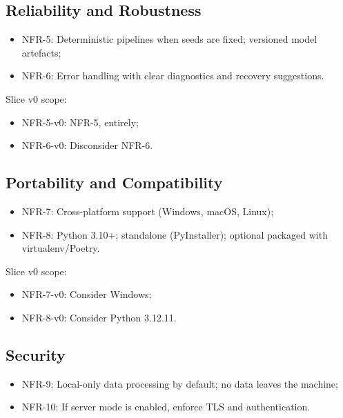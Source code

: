 \subsection{Reliability and Robustness}

\begin{itemize}
    \item NFR-5: Deterministic pipelines when seeds are fixed; versioned model artefacts;
    \item NFR-6: Error handling with clear diagnostics and recovery suggestions.
\end{itemize}

Slice v0 scope:

\begin{itemize}
    \item NFR-5-v0: NFR-5, entirely;
    \item NFR-6-v0: Disconsider NFR-6.
\end{itemize}

\subsection{Portability and Compatibility}

\begin{itemize}
    \item NFR-7: Cross-platform support (Windows, macOS, Linux);
    \item NFR-8: Python 3.10+; standalone (PyInstaller); optional packaged with virtualenv/Poetry.
\end{itemize}

Slice v0 scope:

\begin{itemize}
    \item NFR-7-v0: Consider Windows;
    \item NFR-8-v0: Consider Python 3.12.11.
\end{itemize}

\subsection{Security}

\begin{itemize}
    \item NFR-9: Local-only data processing by default; no data leaves the machine;
    \item NFR-10: If server mode is enabled, enforce TLS and authentication.
\end{itemize}

